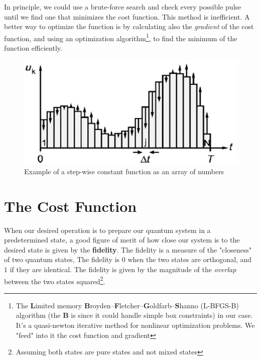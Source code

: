 In principle, we could use a brute-force search and check every possible pulse until we find one that minimizes the cost function. This method is inefficient. A better way to optimize the function is by calculating also the \textit{gradient} of the cost function, and using an optimization algorithm\footnote{The \textbf{L}imited memory \textbf{B}royden–\textbf{F}letcher–\textbf{G}oldfarb–\textbf{S}hanno (L-BFGS-B) algorithm (the \textbf{B} is since it could handle simple box constraints) in our case. It's a quasi-newton iterative method for nonlinear optimization problems. We "feed" into it the cost function and gradient}, to find the minimum of the function efficiently.
\begin{figure}[H]
    \centering
    \includegraphics[width=0.7\columnwidth]{gfx/const_piece.png} %
    \caption{Example of a step-wise constant function as an array of numbers}
    \label{fig:step-wise-const}
\end{figure}
\section{The Cost Function}
When our desired operation is to prepare our quantum system in a predetermined state, a good figure of merit of how close our system is to the desired state is given by the \textbf{fidelity}. The fidelity is a measure of the "closeness" of two quantum states, The fidelity is $0$ when the two states are orthogonal, and $1$ if they are identical. The fidelity is given by the magnitude of the \textit{overlap} between the two states squared\footnote{Assuming both states are pure states and not mixed states}.

